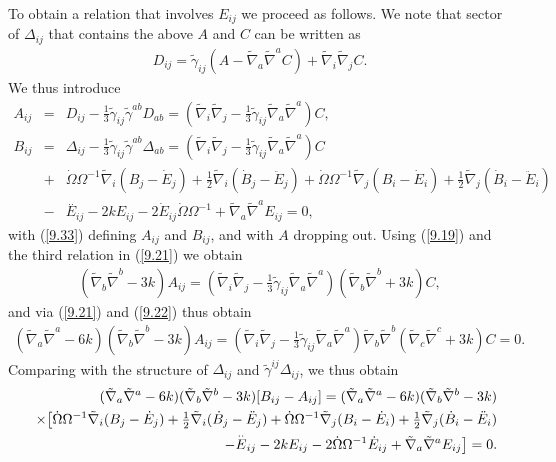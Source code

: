 \documentclass[aps,onecolumn,10pt]{revtex4}
\numberwithin{equation}{section}
\numberwithin{equation}{section}
\begin{document}
To obtain a relation that involves $E_{ij}$ we proceed as follows. We note that sector of $\Delta_{ij}$ that contains the above $A$ and $C$ can be written as 
%
\begin{eqnarray}
D_{ij}=\tilde{\gamma}_{ij}(A-\tilde{\nabla}_a\tilde{\nabla}^aC)+\tilde{\nabla}_i\tilde{\nabla}_jC.
\label{9.32}
\end{eqnarray}
%
We thus introduce 
%
\begin{eqnarray}
A_{ij}&=&D_{ij}-\frac{1}{3}\tilde{\gamma}_{ij}\tilde{\gamma}^{ab}D_{ab}=(\tilde{\nabla}_i\tilde{\nabla}_j-\tfrac{1}{3} \tilde{\gamma}_{ij}\tilde{\nabla}_a\tilde{\nabla}^a)C,
\nonumber\\
B_{ij}&=&\Delta_{ij}-\frac{1}{3}\tilde{\gamma}_{ij}\tilde{\gamma}^{ab}\Delta_{ab}=(\tilde{\nabla}_i\tilde{\nabla}_j-\tfrac{1}{3} \tilde{\gamma}_{ij}\tilde{\nabla}_a\tilde{\nabla}^a)C
\nonumber\\
&+&\dot{\Omega} \Omega^{-1} \tilde{\nabla}_{i}(B_{j}-\dot E_j)+\tfrac{1}{2} \tilde{\nabla}_{i}(\dot{B}_{j}-\ddot{E}_j)
+\dot{\Omega} \Omega^{-1} \tilde{\nabla}_{j}(B_{i}-\dot E_i)+\tfrac{1}{2} \tilde{\nabla}_{j}(\dot{B}_{i}-\ddot{E}_i)
\nonumber\\
&-& \overset{..}{E}_{ij} - 2 k E_{ij} - 2 \dot{E}_{ij} \dot{\Omega} \Omega^{-1} + \tilde{\nabla}_{a}\tilde{\nabla}^{a}E_{ij}=0,
\label{9.33}
\end{eqnarray}
%
with (\ref{9.33}) defining $A_{ij}$ and $B_{ij}$, and with $A$ dropping out. Using (\ref{9.19}) and the third relation in (\ref{9.21}) we obtain
%
\begin{eqnarray}
(\tilde{\nabla}_b\tilde{\nabla}^b-3k)A_{ij}=
(\tilde{\nabla}_i\tilde{\nabla}_j-\tfrac{1}{3} \tilde{\gamma}_{ij}\tilde{\nabla}_a\tilde{\nabla}^a)(\tilde{\nabla}_b\tilde{\nabla}^b+3k)C,
\label{9.34}
\end{eqnarray}
%
and via (\ref{9.21}) and (\ref{9.22}) thus obtain 
%
\begin{eqnarray}
(\tilde{\nabla}_a\tilde{\nabla}^a-6k)(\tilde{\nabla}_b\tilde{\nabla}^b-3k)A_{ij}=
(\tilde{\nabla}_i\tilde{\nabla}_j-\tfrac{1}{3} \tilde{\gamma}_{ij}\tilde{\nabla}_a\tilde{\nabla}^a)\tilde{\nabla}_b\tilde{\nabla}^b(\tilde{\nabla}_c\tilde{\nabla}^c+3k)C=0.
\label{9.35}
\end{eqnarray}
%
 Comparing with the structure of $\Delta_{ij}$ and $\tilde{\gamma}^{ij}\Delta_{ij}$, we thus obtain
 \begin{eqnarray}
 &&(\tilde{\nabla}_a\tilde{\nabla}^a-6k)(\tilde{\nabla}_b\tilde{\nabla}^b-3k)[B_{ij}-A_{ij}]
 =(\tilde{\nabla}_a\tilde{\nabla}^a-6k)(\tilde{\nabla}_b\tilde{\nabla}^b-3k)
 \nonumber\\
 &&\times
 \big{[}\dot{\Omega} \Omega^{-1} \tilde{\nabla}_{i}(B_{j}-\dot E_j)+\tfrac{1}{2} \tilde{\nabla}_{i}(\dot{B}_{j}-\ddot{E}_j)
+\dot{\Omega} \Omega^{-1} \tilde{\nabla}_{j}(B_{i}-\dot E_i)+\tfrac{1}{2} \tilde{\nabla}_{j}(\dot{B}_{i}-\ddot{E}_i)
\nonumber\\
&& -\overset{..}{E}_{ij} - 2 k E_{ij} - 2  \dot{\Omega} \Omega^{-1}\dot{E}_{ij} + \tilde{\nabla}_{a}\tilde{\nabla}^{a}E_{ij}\big{]}=0.
\label{9.36}
\end{eqnarray}
\end{document}

